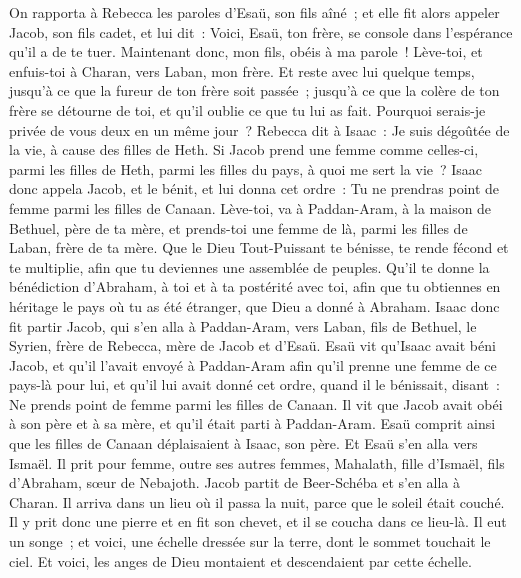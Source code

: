 \begin{multicols}{2}
On rapporta à Rebecca les paroles d'Esaü, son fils aîné~; et elle fit alors appeler Jacob, son fils cadet, et lui dit~: Voici, Esaü, ton frère, se console dans l'espérance qu'il a de te tuer.
Maintenant donc, mon fils, obéis à ma parole~! Lève-toi, et enfuis-toi à Charan, vers Laban, mon frère.
Et reste avec lui quelque temps, jusqu'à ce que la fureur de ton frère soit passée~;
jusqu'à ce que la colère de ton frère se détourne de toi, et qu'il oublie ce que tu lui as fait. Pourquoi serais-je privée de vous deux en un même jour~?
Rebecca dit à Isaac~: Je suis dégoûtée de la vie, à cause des filles de Heth. Si Jacob prend une femme comme celles-ci, parmi les filles de Heth, parmi les filles du pays, à quoi me sert la vie~?
\VerseOne{}Isaac donc appela Jacob, et le bénit, et lui donna cet ordre~: Tu ne prendras point de femme parmi les filles de Canaan.
Lève-toi, va à Paddan-Aram, à la maison de Bethuel, père de ta mère, et prends-toi une femme de là, parmi les filles de Laban, frère de ta mère.
Que le Dieu Tout-Puissant te bénisse, te rende fécond et te multiplie, afin que tu deviennes une assemblée de peuples.
Qu'il te donne la bénédiction d'Abraham, à toi et à ta postérité avec toi, afin que tu obtiennes en héritage le pays où tu as été étranger, que Dieu a donné à Abraham.
Isaac donc fit partir Jacob, qui s'en alla à Paddan-Aram, vers Laban, fils de Bethuel, le Syrien, frère de Rebecca, mère de Jacob et d'Esaü.
Esaü vit qu'Isaac avait béni Jacob, et qu'il l'avait envoyé à Paddan-Aram afin qu'il prenne une femme de ce pays-là pour lui, et qu'il lui avait donné cet ordre, quand il le bénissait, disant~: Ne prends point de femme parmi les filles de Canaan.
Il vit que Jacob avait obéi à son père et à sa mère, et qu'il était parti à Paddan-Aram.
Esaü comprit ainsi que les filles de Canaan déplaisaient à Isaac, son père.
Et Esaü s'en alla vers Ismaël. Il prit pour femme, outre ses autres femmes, Mahalath, fille d'Ismaël, fils d'Abraham, sœur de Nebajoth.
Jacob partit de Beer-Schéba et s'en alla à Charan.
Il arriva dans un lieu où il passa la nuit, parce que le soleil était couché. Il y prit donc une pierre et en fit son chevet, et il se coucha dans ce lieu-là.
Il eut un songe~; et voici, une échelle dressée sur la terre, dont le sommet touchait le ciel. Et voici, les anges de Dieu montaient et descendaient par cette échelle.

\end{multicols}
